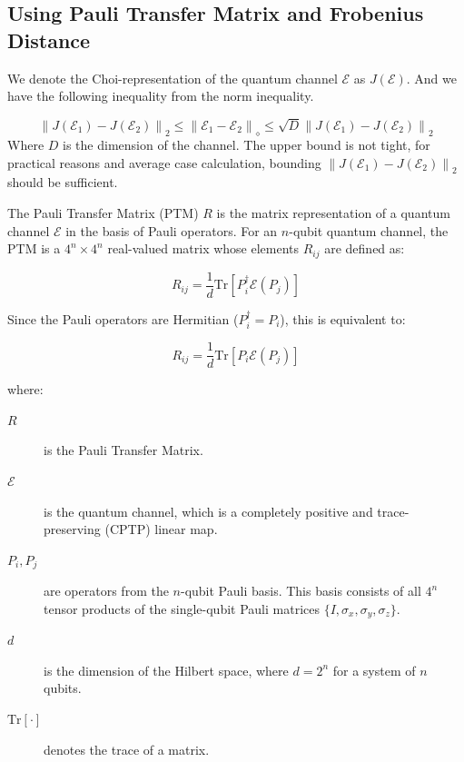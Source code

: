 \documentclass[%
 reprint,
superscriptaddress,
 amsmath,amssymb,
 aps,
]{revtex4-2}
\newcommand{\E}{\mathcal{E}}
\newcommand{\norm}[1]{\left\lVert#1\right\rVert}
\begin{document}
\subsection{Using Pauli Transfer Matrix and Frobenius Distance}

We denote the Choi-representation of the quantum channel $\E$ as $J(\E)$. And we have the following inequality from the norm inequality.

\begin{equation}
    \norm{J(\E_1)-J(\E_2)}_2\le \norm{\E_1-\E_2}_\diamond \le \sqrt{D}\norm{J(\E_1)-J(\E_2)}_2
\end{equation}
Where $D$ is the dimension of the channel. The upper bound is not tight, for practical reasons and average case calculation, bounding $\norm{J(\E_1)-J(\E_2)}_2$ should be sufficient.

The Pauli Transfer Matrix (PTM) $R$ is the matrix representation of a quantum channel $\mathcal{E}$ in the basis of Pauli operators. For an $n$-qubit quantum channel, the PTM is a $4^n \times 4^n$ real-valued matrix whose elements $R_{ij}$ are defined as:

\begin{equation}
    R_{ij} = \frac{1}{d} \mathrm{Tr}\left[ P_i^\dagger \mathcal{E}(P_j) \right]
\end{equation}

Since the Pauli operators are Hermitian ($P_i^\dagger = P_i$), this is equivalent to:

\begin{equation}
    R_{ij} = \frac{1}{d} \mathrm{Tr}\left[ P_i \mathcal{E}(P_j) \right]
\end{equation}

where:
\begin{description}
    \item[$R$] is the Pauli Transfer Matrix.
    \item[$\mathcal{E}$] is the quantum channel, which is a completely positive and trace-preserving (CPTP) linear map.
    \item[$P_i, P_j$] are operators from the $n$-qubit Pauli basis. This basis consists of all $4^n$ tensor products of the single-qubit Pauli matrices $\{I, \sigma_x, \sigma_y, \sigma_z\}$.
    \item[$d$] is the dimension of the Hilbert space, where $d=2^n$ for a system of $n$ qubits.
    \item[${\mathrm{Tr}[\cdot]}$] denotes the trace of a matrix.
\end{description}
\end{document}
